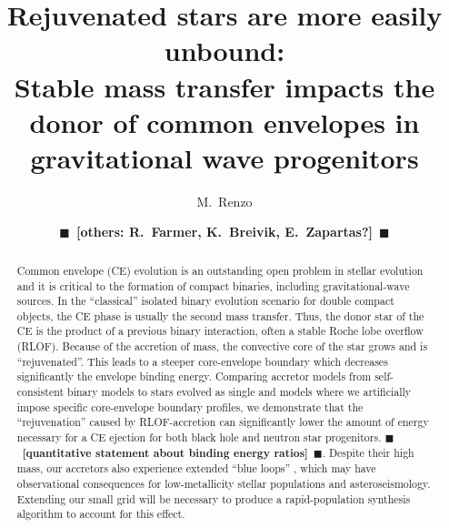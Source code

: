 \documentclass[twocolumn,twocolappendix,trackchanges]{aastex63}
\newcommand{\todo}[1]{{\large $\blacksquare$~\textbf{\color{red}[#1]}}~$\blacksquare$}
\begin{document}
\graphicspath{{../static/}}

\title{Rejuvenated stars are more easily unbound:\\ Stable
  mass transfer impacts the donor of common envelopes  in gravitational wave progenitors}

\author[0000-0002-6718-9472]{M.~Renzo}

\author{\todo{others: R.~Farmer, K.~Breivik, E.~Zapartas?}}


\begin{abstract}
  Common envelope (CE) evolution is an outstanding open problem in
  stellar evolution and it is critical to the formation of compact
  binaries, including gravitational-wave sources. In the ``classical''
  isolated binary evolution scenario for double compact objects, the
  CE phase is usually the second mass transfer. Thus, the donor star
  of the CE is the product of a previous binary interaction, often a
  stable Roche lobe overflow (RLOF). Because of the accretion of mass,
  the convective core of the star grows and is ``rejuvenated''. This
  leads to a steeper core-envelope boundary which decreases
  significantly the envelope binding energy. Comparing accretor models
  from self-consistent binary models to stars evolved as single and
  models where we artificially impose specific core-envelope boundary
  profiles, we demonstrate that the ``rejuvenation'' caused by
  RLOF-accretion can significantly lower the amount of energy necessary
  for a CE ejection for both black hole and neutron star progenitors.
  \todo{quantitative statement about binding energy ratios}.
  Despite their high mass, our accretors also experience extended
  ``blue loops'' , which may have observational consequences for
  low-metallicity stellar populations and asteroseismology. Extending
  our small grid will be necessary to produce a rapid-population
  synthesis algorithm to account for this effect.
\end{abstract}

\end{document}
